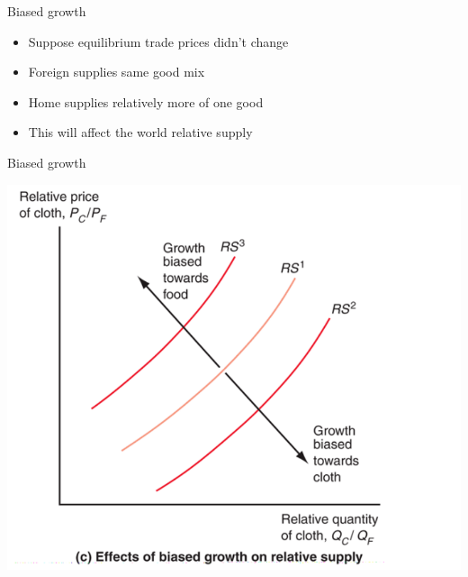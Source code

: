 \documentclass[ignorenonframetext,]{beamer}
\begin{document}
\begin{frame}{Biased growth}

    \begin{itemize}
        \item Suppose equilibrium trade prices didn't change
        \item Foreign supplies same good mix
        \item Home supplies relatively more of one good 
        \item This will affect the world relative supply 
    \end{itemize}

\end{frame}

\begin{frame}{Biased growth}

    \includegraphics[scale=0.25]{biased_growth_rs.png}

\end{frame}
\end{document}
